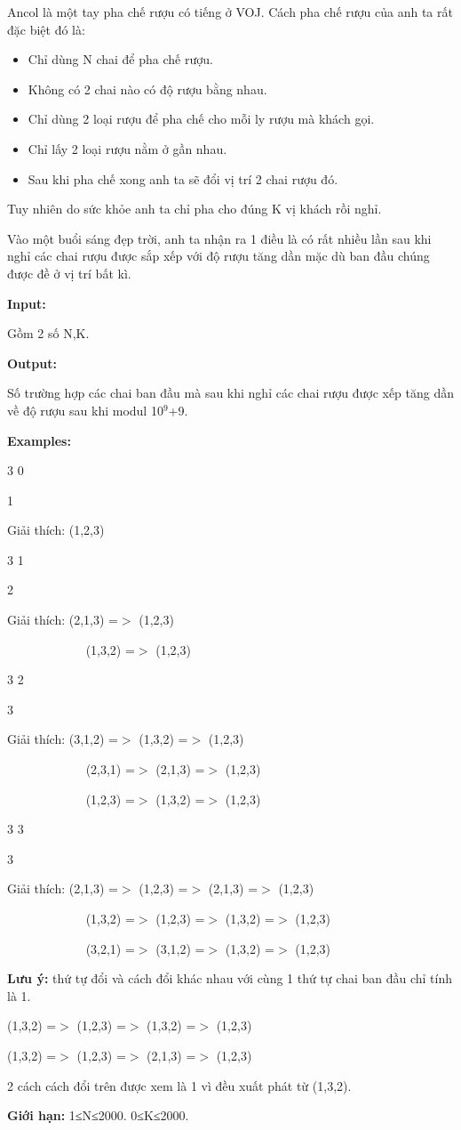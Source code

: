 

Ancol là một tay pha chế rượu có tiếng ở VOJ. Cách pha chế rượu của anh ta rất đặc biệt đó là:
\begin{itemize}
	\item Chỉ dùng N chai để pha chế rượu.
	\item Không có 2 chai nào có độ rượu bằng nhau.
	\item Chỉ dùng 2 loại rượu để pha chế cho mỗi ly rượu mà khách gọi.
	\item Chỉ lấy 2 loại rượu nằm ở gần nhau.
	\item Sau khi pha chế xong anh ta sẽ đổi vị trí 2 chai rượu đó.
\end{itemize}

Tuy nhiên do sức khỏe anh ta chỉ pha cho đúng K vị khách rồi nghỉ.

Vào một buổi sáng đẹp trời, anh ta nhận ra 1 điều là có rất nhiều lần sau khi nghỉ các chai rượu được sắp xếp với độ rượu tăng dần mặc dù ban đầu chúng được đề ở vị trí bất kì.

\textbf{Input:}

Gồm 2 số N,K.

\textbf{Output:}

Số trường hợp các chai ban đầu mà sau khi nghỉ các chai rượu được xếp tăng dần về độ rượu sau khi modul 10$^9$+9.

\textbf{Examples:}

3 0       

1   

Giải thích: (1,2,3)

3 1 

2                  

Giải thích: (2,1,3) =$>$ (1,2,3)

               (1,3,2) =$>$ (1,2,3)

3 2                            

3

Giải thích: (3,1,2) =$>$ (1,3,2) =$>$ (1,2,3)

               (2,3,1) =$>$ (2,1,3) =$>$ (1,2,3)

               (1,2,3) =$>$ (1,3,2) =$>$ (1,2,3)

3 3    

3                

Giải thích: (2,1,3) =$>$ (1,2,3) =$>$ (2,1,3) =$>$ (1,2,3)

               (1,3,2) =$>$ (1,2,3) =$>$ (1,3,2) =$>$ (1,2,3)

               (3,2,1) =$>$ (3,1,2) =$>$ (1,3,2) =$>$ (1,2,3)

\textbf{Lưu ý:} thứ tự đổi và cách đổi khác nhau với cùng 1 thứ tự chai ban đầu chỉ tính là 1.

(1,3,2) =$>$ (1,2,3) =$>$ (1,3,2) =$>$ (1,2,3)

(1,3,2) =$>$ (1,2,3) =$>$ (2,1,3) =$>$ (1,2,3)

2 cách cách đổi trên được xem là 1 vì đều xuất phát từ (1,3,2).

\textbf{Giới hạn:} 1≤N≤2000. 0≤K≤2000.

 

 